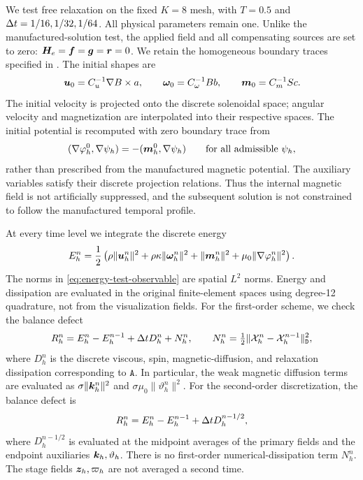 We test free relaxation on the fixed $K=8$ mesh, with $T=0.5$
and $\Delta t=1/16,1/32,1/64$. All physical parameters remain one.
Unlike the manufactured-solution test, the applied field and all
compensating sources are set to zero:
$\boldsymbol H_e=\boldsymbol f=\boldsymbol g=\boldsymbol r=0$.
We retain the homogeneous boundary traces specified in
.
The initial shapes are
\[
\boldsymbol u_0=C_u^{-1}\nabla B\times a,\qquad
\boldsymbol\omega_0=C_\omega^{-1}B b,\qquad
\boldsymbol m_0=C_m^{-1}S c.
\]
The initial velocity is projected onto the discrete solenoidal space;
angular velocity and magnetization are interpolated into their
respective spaces. The initial potential is recomputed with zero
boundary trace from
\[
(\nabla\varphi_h^0,\nabla\psi_h)
=-(\boldsymbol m_h^0,\nabla\psi_h)
\qquad\text{for all admissible }\psi_h,
\]
rather than prescribed from the manufactured magnetic potential.
The auxiliary variables satisfy their discrete projection relations.
Thus the internal magnetic field is not artificially suppressed,
and the subsequent solution is not constrained to follow the
manufactured temporal profile.

At every time level we integrate the discrete energy
\begin{equation}\label{eq:energy-test-observable}
E_h^n=\frac12\left(
\rho\|\boldsymbol u_h^n\|^2+
\rho\kappa\|\boldsymbol\omega_h^n\|^2+
\|\boldsymbol m_h^n\|^2+
\mu_0\|\nabla\varphi_h^n\|^2\right).
\end{equation}
The norms in \eqref{eq:energy-test-observable} are spatial $L^2$ norms.
Energy and dissipation are evaluated in the original finite-element
spaces using degree-12 quadrature, not from the visualization fields.
For the first-order scheme, we check the balance defect
\begin{equation}\label{eq:energy-test-first-balance}
R_h^n=E_h^n-E_h^{n-1}+\Delta t D_h^n+N_h^n,
\qquad
N_h^n=\tfrac12\|\mathcal X_h^n-\mathcal X_h^{n-1}\|_{\mathtt D}^2,
\end{equation}
where $D_h^n$ is the discrete viscous, spin, magnetic-diffusion,
and relaxation dissipation corresponding to $\mathtt A$.
In particular, the weak magnetic diffusion terms are evaluated as
$\sigma\|\boldsymbol k_h^n\|^2$ and
$\sigma\mu_0\|\vartheta_h^n\|^2$.
For the second-order discretization, the balance defect is
\begin{equation}\label{eq:energy-test-second-balance}
R_h^n=E_h^n-E_h^{n-1}+\Delta t D_h^{n-1/2},
\end{equation}
where $D_h^{n-1/2}$ is evaluated at the midpoint averages of the
primary fields and the endpoint auxiliaries
$\boldsymbol k_h,\vartheta_h$.
There is no first-order numerical-dissipation term $N_h^n$.
The stage fields $\boldsymbol z_h,\varpi_h$ are not averaged a second time.

